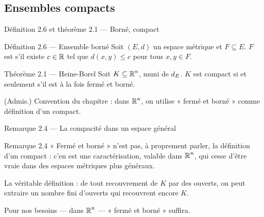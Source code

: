 \subsection{Ensembles compacts}

\begin{frame}{Définition 2.6 et théorème 2.1 --- Borné, compact}
  \begin{Enonce}{Définition 2.6 --- Ensemble borné}
    Soit $(E,d)$ un espace métrique et $F\subseteq E$. $F$ est
     s'il existe $c\in\operatorname{\mathbb{R}}$ tel que $d(x,y)\leq c$ pour tous
    $x,y\in F$.
  \end{Enonce}
  \begin{Enonce}{Théorème 2.1 --- Heine-Borel}
    Soit $K\subseteq\operatorname{\mathbb{R}}^n$, muni de $d_E$. $K$ est compact si et
    seulement s'il est à la fois fermé et borné.
  \end{Enonce}
  \small (Admis.) Convention du chapitre : dans $\operatorname{\mathbb{R}}^n$, on
  utilise « fermé et borné » comme définition d'un compact.
\end{frame}

\begin{frame}{Remarque 2.4 --- La compacité dans un espace général}
  \begin{Rem}{Remarque 2.4}
    « Fermé et borné » n'est pas, à proprement parler, la
    définition d'un compact : c'en est une
    caractérisation, valable dans $\operatorname{\mathbb{R}}^n$, qui cesse d'être
    vraie dans des espaces métriques plus généraux.
    \vspace{4pt}

    La véritable définition : de tout recouvrement de $K$ par des
    ouverts, on peut extraire un nombre fini d'ouverts qui
    recouvrent encore $K$.
  \end{Rem}
  \vspace{4pt}
  \small Pour nos besoins --- dans $\operatorname{\mathbb{R}}^n$ --- « fermé et borné »
  suffira.
\end{frame}
